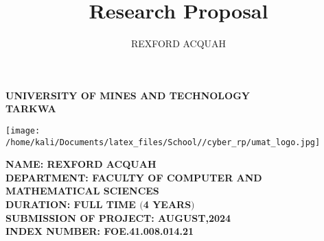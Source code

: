 \documentclass[12pt,a4paper]{report}
\author{REXFORD ACQUAH}
\title{Research Proposal}
\newcommand{\school}{
	\centering
	\textbf{\large UNIVERSITY OF MINES AND TECHNOLOGY \\TARKWA
	}
}
\newcommand{\rpaim}{
	\textbf{\large {NAME: REXFORD ACQUAH \\
		 DEPARTMENT: FACULTY OF COMPUTER AND MATHEMATICAL SCIENCES  \\
		 DURATION: FULL TIME $($4 YEARS$)$ \\
		 SUBMISSION OF PROJECT: AUGUST,2024 \\
		\vspace{2cm}
		INDEX NUMBER: FOE.41.008.014.21
		}}}
\begin{document}
	\begin{titlepage}
		\school
		\vspace{2cm}
		\begin{center}
			\texttt{[image: /home/kali/Documents/latex\_files/School//cyber\_rp/umat\_logo.jpg]} %
		\end{center}
		\begin{flushleft}
				\rpaim
		\end{flushleft}

		\vfill

	\end{titlepage}
\end{document}
